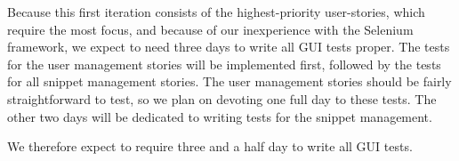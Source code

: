 \documentclass[10pt,a4paper,BCOR12mm, headexclude, footexclude,
  twoside, openright]{scrartcl}
\numberwithin{equation}{section} %
\numberwithin{figure}{section} %
\numberwithin{table}{section} %
\begin{document}
Because this first iteration consists of the highest-priority user-stories, which require the most focus, and because of our inexperience with the Selenium framework, we expect to need three days to write all GUI tests proper.
The tests for the user management stories will be implemented first, followed by the tests for all snippet management stories.
The user management stories should be fairly straightforward to test, so we plan on devoting one full day to these tests.
The other two days will be dedicated to writing tests for the snippet management.

We therefore expect to require three and a half day to write all GUI tests.
\end{document}
